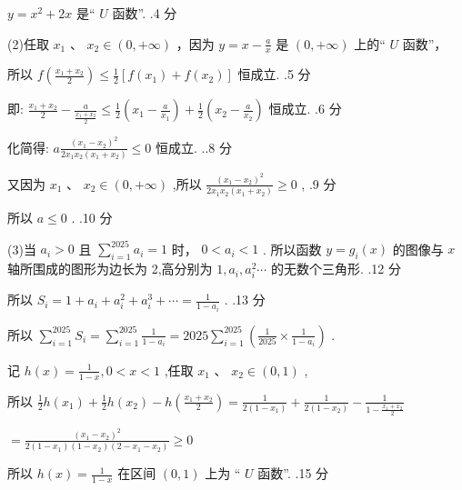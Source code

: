 \documentclass[10pt]{article}
\newcommand*\circled[1]{\tikz[baseline=(char.base)]{\node[shape=circle,draw,inner sep=1.5pt] (char) {\small #1};}}
\begin{document}
 \circled{2}  \(y = {x}^{2} + {2x}\) 是“ \(U\) 函数”. .4 分

(2)任取 \({x}_{1}\text{ 、 }{x}_{2} \in  \left( {0, + \infty }\right)\) ，因为 \(y = x - \frac{a}{x}\) 是 \(\left( {0, + \infty }\right)\) 上的“ \(U\) 函数”，

所以 \(f\left( \frac{{x}_{1} + {x}_{2}}{2}\right)  \leq  \frac{1}{2}\left\lbrack  {f\left( {x}_{1}\right)  + f\left( {x}_{2}\right) }\right\rbrack\) 恒成立. .5 分

即: \(\frac{{x}_{1} + {x}_{2}}{2} - \frac{a}{\frac{{x}_{1} + {x}_{2}}{2}} \leq  \frac{1}{2}\left( {{x}_{1} - \frac{a}{{x}_{1}}}\right)  + \frac{1}{2}\left( {{x}_{2} - \frac{a}{{x}_{2}}}\right)\) 恒成立. .6 分

化简得: \(a\frac{{\left( {x}_{1} - {x}_{2}\right) }^{2}}{2{x}_{1}{x}_{2}\left( {{x}_{1} + {x}_{2}}\right) } \leq  0\) 恒成立. ..8 分

又因为 \({x}_{1}\text{ 、 }{x}_{2} \in  \left( {0, + \infty }\right)\) ,所以 \(\frac{{\left( {x}_{1} - {x}_{2}\right) }^{2}}{2{x}_{1}{x}_{2}\left( {{x}_{1} + {x}_{2}}\right) } \geq  0\) , .9 分

所以 \(a \leq  0\) . .10 分

(3)当 \({a}_{i} > 0\) 且 \(\mathop{\sum }\limits_{{i = 1}}^{{2025}}{a}_{i} = 1\) 时， \(0 < {a}_{i} < 1\) . 所以函数 \(y = {g}_{i}\left( x\right)\) 的图像与 \(x\) 轴所围成的图形为边长为 2,高分别为 \(1,{a}_{i},{a}_{i}^{2}\cdots\) 的无数个三角形. .12 分

所以 \({S}_{i} = 1 + {a}_{i} + {a}_{i}^{2} + {a}_{i}^{3} + \cdots  = \frac{1}{1 - {a}_{i}}\) . .13 分

所以 \(\mathop{\sum }\limits_{{i = 1}}^{{2025}}{S}_{i} = \mathop{\sum }\limits_{{i = 1}}^{{2025}}\frac{1}{1 - {a}_{i}} = {2025}\mathop{\sum }\limits_{{i = 1}}^{{2025}}\left( {\frac{1}{2025} \times  \frac{1}{1 - {a}_{i}}}\right)\) .

记 \(h\left( x\right)  = \frac{1}{1 - x},0 < x < 1\) ,任取 \({x}_{1}\text{ 、 }{x}_{2} \in  \left( {0,1}\right)\) ,

所以 \(\frac{1}{2}h\left( {x}_{1}\right)  + \frac{1}{2}h\left( {x}_{2}\right)  - h\left( \frac{{x}_{1} + {x}_{2}}{2}\right)  = \frac{1}{2\left( {1 - {x}_{1}}\right) } + \frac{1}{2\left( {1 - {x}_{2}}\right) } - \frac{1}{1 - \frac{{x}_{1} + {x}_{2}}{2}}\)

\(= \frac{{\left( {x}_{1} - {x}_{2}\right) }^{2}}{2\left( {1 - {x}_{1}}\right) \left( {1 - {x}_{2}}\right) \left( {2 - {x}_{1} - {x}_{2}}\right) } \geq  0\)

所以 \(h\left( x\right)  = \frac{1}{1 - x}\) 在区间 \(\left( {0,1}\right)\) 上为 “ \(U\) 函数”. .15 分
\end{document}
